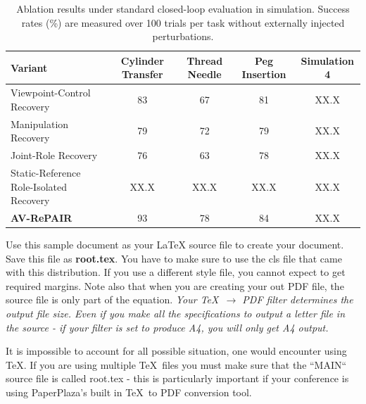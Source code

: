\documentclass[letterpaper, 10 pt, conference]{ieeeconf}  %
\begin{document}
\begin{table}[t]
    \centering
    \caption{Ablation results under standard closed-loop evaluation in simulation. Success rates (\%) are measured over 100 trials per task without externally injected perturbations.}
    \label{tab:recovery_ablation}
    \renewcommand{\arraystretch}{1.0}
    \begin{tabular*}{\textwidth}{
        @{\extracolsep{\fill}}
        lcccc
        @{}
    }
        \toprule
        \textbf{Variant}
        & \textbf{Cylinder Transfer}
        & \textbf{Thread Needle}
        & \textbf{Peg Insertion}
        & \textbf{Simulation 4} \\
        \midrule

        Viewpoint-Control Recovery
        & 83 & 67 & 81 & XX.X \\

        Manipulation Recovery
        & 79 & 72 & 79 & XX.X \\

        Joint-Role Recovery
        & 76 & 63 & 78 &XX.X  \\

        Static-Reference Role-Isolated Recovery
        & XX.X & XX.X & XX.X & XX.X \\

        \midrule
        \textbf{AV-RePAIR}
        & 93 & 78  & 84 & XX.X \\

        \bottomrule
    \end{tabular*}
\end{table}

Use this sample document as your LaTeX source file to create your document. Save this file as {\bf root.tex}. You have to make sure to use the cls file that came with this distribution. If you use a different style file, you cannot expect to get required margins. Note also that when you are creating your out PDF file, the source file is only part of the equation. {\it Your \TeX\ $\rightarrow$ PDF filter determines the output file size. Even if you make all the specifications to output a letter file in the source - if your filter is set to produce A4, you will only get A4 output. }

It is impossible to account for all possible situation, one would encounter using \TeX. If you are using multiple \TeX\ files you must make sure that the ``MAIN`` source file is called root.tex - this is particularly important if your conference is using PaperPlaza's built in \TeX\ to PDF conversion tool.
\end{document}
